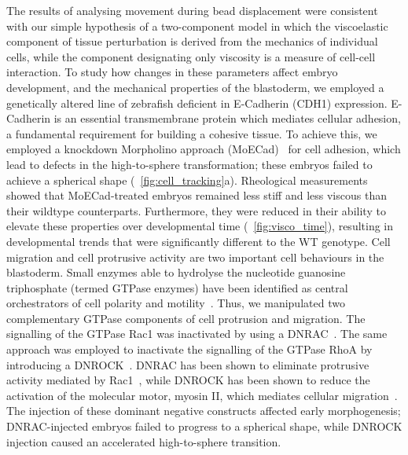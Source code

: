 The results of analysing movement during bead displacement were consistent with our simple hypothesis of a two-component model in which the viscoelastic component of tissue perturbation is derived from the mechanics of individual cells, while the component designating only viscosity is a measure of cell-cell interaction.
To study how changes in these parameters affect embryo development, and the mechanical properties of the blastoderm, we employed a genetically altered line of zebrafish deficient in E-Cadherin (CDH1) expression.
E-Cadherin is an essential transmembrane protein which mediates cellular adhesion, a fundamental requirement for building a cohesive tissue.
To achieve this, we employed a knockdown Morpholino approach (MoECad)~\cite{babbEcadherinRegulatesCell2004} for cell adhesion, which lead to defects in the high-to-sphere transformation;
these embryos failed to achieve a spherical shape (\figurename~\ref{fig:cell_tracking}a).
Rheological measurements showed that MoECad-treated embryos remained less stiff and less viscous than their wildtype counterparts.
Furthermore, they were reduced in their ability to elevate these properties over developmental time (\figurename~\ref{fig:visco_time}), resulting in developmental trends that were significantly different to the \gls{WT} genotype.
Cell migration and cell protrusive activity are two important cell behaviours in the blastoderm.
Small enzymes able to hydrolyse the nucleotide guanosine triphosphate (termed GTPase enzymes) have been identified as central orchestrators of cell polarity and motility~\cite{machacekCoordinationRhoGTPase2009}.
Thus, we manipulated two complementary GTPase components of cell protrusion and migration.
The signalling of the GTPase \gls{Rac1} was inactivated by using a \gls{DNRAC}~\cite{tahinciDistinctFunctionsRho2003}.
The same approach was employed to inactivate the signalling of the GTPase \gls{RhoA} by introducing a \gls{DNROCK}~\cite{witzelWnt11ControlsCell2006}.
\gls{DNRAC} has been shown to eliminate protrusive activity mediated by \gls{Rac1}~\cite{tahinciDistinctFunctionsRho2003}, while \gls{DNROCK} has been shown to reduce the activation of the molecular motor, myosin II, which mediates cellular migration~\cite{vicente-manzanaresNonmuscleMyosinII2009,
vicente-manzanaresRegulationProtrusionAdhesion2007}. %
The injection of these dominant negative constructs affected early morphogenesis; \gls{DNRAC}-injected embryos failed to progress to a spherical shape, while \gls{DNROCK} injection caused an accelerated high-to-sphere transition.
